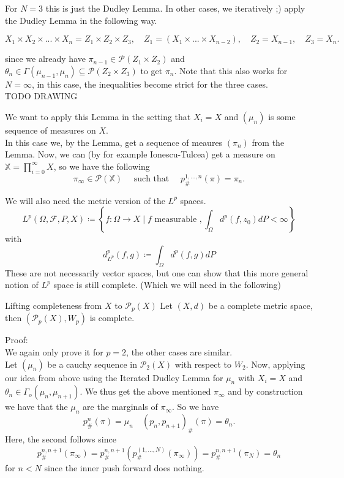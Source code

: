 \documentclass[15pt]{article}
\begin{document}
For $N = 3$ this is just the Dudley Lemma. In other cases, we iteratively ;) apply the Dudley Lemma in the following way. 

$$X_1 \times X_2 \times ... \times X_n = Z_1 \times Z_2 \times Z_3, \quad Z_1 = (X_1 \times ... \times X_{n-2}), \quad Z_2 = X_{n-1}, \quad Z_3 = X_n.$$

since we already have $\pi_{n-1} \in \mathcal{P}(Z_1 \times Z_2)$ and $\theta_n \in \Gamma(\mu_{n-1}, \mu_{n}) \subseteq \mathcal{P}(Z_2 \times Z_3)$ to get $\pi_n$. Note that this also works for $N = \infty$, in this case, the inequalities become strict for the three cases. \\
TODO DRAWING

\bigbreak

We want to apply this Lemma in the setting that $X_i =X$ and $(\mu_n)$ is some sequence of measures on $X$. \\
In this case we, by the Lemma, get a sequence of meaures $(\pi_n)$ from the Lemma. Now, we can (by for example Ionescu-Tulcea) get a measure on $\mathbb{X} = \prod_{i = 0}^\infty X$, so we have the following $$\pi_\infty \in \mathcal{P}(\mathbb{X}) \quad \text{ such that } \quad p^{1,...,n}_{\#}(\pi) = \pi_n.$$

We will also need the metric version of the $L^p$ spaces.
$$L^p(\Omega,\mathcal{F}, P, X) \coloneqq \left\{ f : \Omega \rightarrow X \mid f \text{ measurable }, \int_\Omega d^p(f,z_0) d P < \infty \right\}$$ with$$d_{L^p}^p(f,g) \coloneqq \int_\Omega d^p(f,g) dP$$
These are not necessarily vector spaces, but one can show that this more general notion of $L^p$ space is still complete. (Which we will need in the following)

\begin{theorem}{Lifting completeness from $X$ to $\mathcal{P}_p(X)$}{}
  Let $(X,d)$ be a complete metric space, then $(\mathcal{P}_p(X), W_p)$ is complete.
\end{theorem}

Proof: 
\vspace{0.3cm} \\
We again only prove it for $p = 2$, the other cases are similar.  \\

Let $(\mu_n)$ be a cauchy sequence in $\mathcal{P}_2(X)$ with respect to $W_2$. 
Now, applying our idea from above using the Iterated Dudley Lemma for $\mu_n$ with $X_i = X$ and $\theta_n \in \Gamma_o(\mu_n,\mu_{n+1})$.
We thus get the above mentioned $\pi_\infty$ and by construction we have that the $\mu_n$ are the marginals of $\pi_\infty$. So we have $$p^n_{\#}(\pi) = \mu_n \quad (p_n,p_{n+1})_{\#}(\pi) = \theta_n.$$ 
Here, the second follows since $$p^{n,n+1}_{\#}(\pi_\infty) =p^{n,n+1}_{\#}(p^{(1,...,N)}_{\#}(\pi_\infty)) = p^{n,n+1}_{\#}(\pi_N)=\theta_n$$ for $n < N$ since the inner push forward does nothing.
\end{document}
